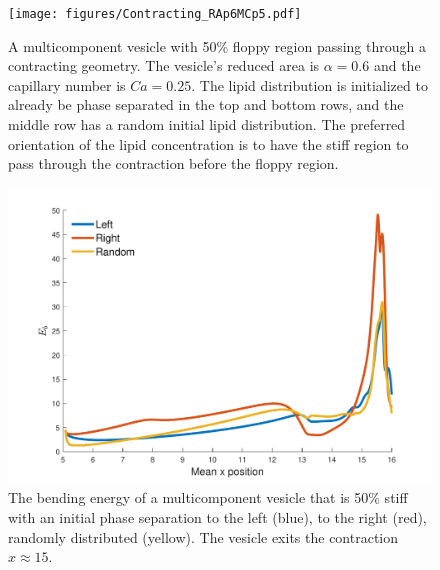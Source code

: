 \documentclass[twoside,twocolumn,9pt]{article}
\newcommand{\subfigimg}[3][,]{%
  \setbox1=\hbox{\texttt{[image: \#3]}}%
  \leavevmode\rlap{\usebox1}%
  \rlap{\hspace*{0pt}\raisebox{\dimexpr\ht1-0\baselineskip}{\bf
  \normalsize #2}}%
  \phantom{\usebox1}%
}
\begin{document}
\begin{figure}[H]
  \centering
  \texttt{[image: figures/Contracting\_RAp6MCp5.pdf]}
  \caption{\label{fig:RA6leftRightRand} \small A multicomponent vesicle
  with 50\% floppy region passing through a contracting geometry. The
  vesicle's reduced area is $\alpha = 0.6$ and the capillary number is
  $Ca = 0.25$. The lipid distribution is initialized to already be phase
  separated in the top and bottom rows, and the middle row has a random
  initial lipid distribution. The preferred orientation of the lipid
  concentration is to have the stiff region to pass through the
  contraction before the floppy region.}
\end{figure}

\begin{figure}[H]
    \centering
    \includegraphics[width=\columnwidth]{figures/bending_leftRightRand.pdf}
    \caption{The bending energy of a multicomponent vesicle that is 50\% stiff with an initial phase separation to the left (blue), to the right (red), randomly distributed (yellow). The vesicle exits the contraction $x \approx 15$.}
    \label{fig:RAp6leftRightRandBending}
\end{figure}
\end{document}

